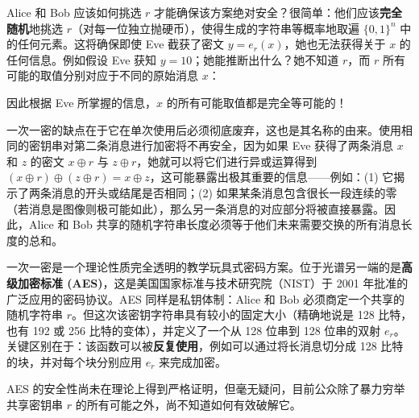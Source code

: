 Alice 和 Bob 应该如何挑选 $r$ 才能确保该方案绝对安全？很简单：他们应该\textbf{完全随机}地挑选 $r$（对每一位独立抛硬币），使得生成的字符串等概率地取遍 $\{0, 1\}^n$ 中的任何元素。这将确保即使 Eve 截获了密文 $y = e_r(x)$，她也无法获得关于 $x$ 的任何信息。例如假设 Eve 获知 $y = 10$；她能推断出什么？她不知道 $r$，而 $r$ 所有可能的取值分别对应于不同的原始消息 $x$：
\begin{center}
\end{center}
因此根据 Eve 所掌握的信息，$x$ 的所有可能取值都是完全等可能的！

一次一密的缺点在于它在单次使用后必须彻底废弃，这也是其名称的由来。使用相同的密钥串对第二条消息进行加密将不再安全，因为如果 Eve 获得了两条消息 $x$ 和 $z$ 的密文 $x \oplus r$ 与 $z \oplus r$，她就可以将它们进行异或运算得到 $(x \oplus r) \oplus (z \oplus r) = x \oplus z$，这可能暴露出极其重要的信息——例如：(1) 它揭示了两条消息的开头或结尾是否相同；(2) 如果某条消息包含很长一段连续的零（若消息是图像则极可能如此），那么另一条消息的对应部分将被直接暴露。因此，Alice 和 Bob 共享的随机字符串长度必须等于他们未来需要交换的所有消息长度的总和。

一次一密是一个理论性质完全透明的教学玩具式密码方案。位于光谱另一端的是\textbf{高级加密标准 (AES)}，这是美国国家标准与技术研究院（NIST）于 2001 年批准的广泛应用的密码协议。AES 同样是私钥体制：Alice 和 Bob 必须商定一个共享的随机字符串 $r$。但这次该密钥字符串具有较小的固定大小（精确地说是 128 比特，也有 192 或 256 比特的变体），并定义了一个从 128 位串到 128 位串的双射 $e_r$。关键区别在于：该函数可以被\textbf{反复使用}，例如可以通过将长消息切分成 128 比特的块，并对每个块分别应用 $e_r$ 来完成加密。

AES 的安全性尚未在理论上得到严格证明，但毫无疑问，目前公众除了暴力穷举共享密钥串 $r$ 的所有可能之外，尚不知道如何有效破解它。

